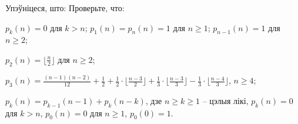 \begin{problemList}
\problemItemWithCommonPart
{Упэўніцеся, што:}
{Проверьте, что:}
{\begin{belarusianEnumerate}
  \item $p_k(n) = 0$ для $k > n$; $p_1(n) = p_n(n) = 1$ для $n \ge 1$; $p_{n - 1}(n) = 1$ для $n \ge 2$;
  \item $p_2(n) = \bigl\lfloor \frac{n}{2} \bigr\rfloor$ для $n \ge 2$;
  \item $p_3(n) = \frac{(n - 1)(n - 2)}{12} + \frac{1}{2} + \frac{1}{2} \cdot \bigl\lfloor
  \frac{n - 3}{2} \bigr\rfloor + \frac{1}{3} \cdot \bigl\lfloor \frac{n - 3}{3} \bigr\rfloor -
  \frac{1}{3} \cdot \bigl\lfloor \frac{n - 4}{3}\bigr\rfloor$, $n \ge 4$;
  \item $p_k(n) = p_{k - 1}(n - 1) + p_k(n - k)$, дзе $n \ge k \ge 1$ -- цэлыя лікі,
  $p_k(n) = 0$ для $k > n$, $p_0(n) = 0$ для $n \ge 1$, $p_0(0) = 1$.
\end{belarusianEnumerate}}

\end{problemList}


